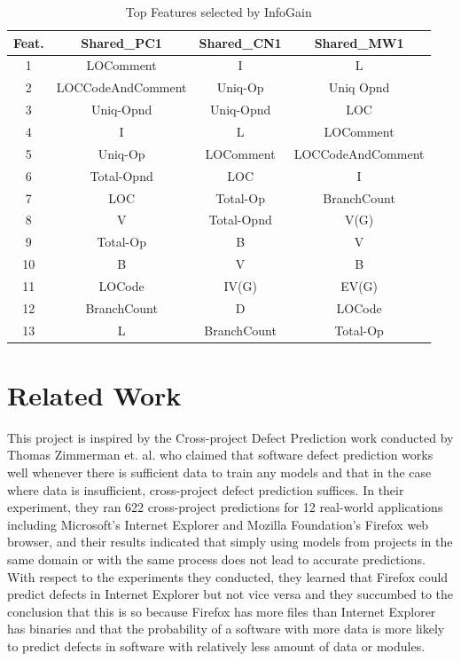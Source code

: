 \documentclass{sig-alternate}
\begin{document}
\begin{table}
\centering
\caption{Top Features selected by InfoGain}
\begin{tabular}{|c|c|c|c|} \hline
Feat.&Shared_PC1&Shared_CN1&Shared_MW1\\\hline
1& LOComment & I & L\\ \hline
2& LOCCodeAndComment & Uniq-Op & Uniq Opnd\\ \hline
3& Uniq-Opnd & Uniq-Opnd & LOC\\ \hline
4&  I & L & LOComment\\ \hline
5& Uniq-Op & LOComment & LOCCodeAndComment\\ \hline
6& Total-Opnd & LOC & I\\ \hline
7& LOC & Total-Op & BranchCount\\ \hline
8& V & Total-Opnd & V(G)\\ \hline
9& Total-Op & B & V\\ \hline
10& B & V & B\\ \hline
11& LOCode & IV(G) & EV(G)\\ \hline
12& BranchCount & D & LOCode\\ \hline
13& L & BranchCount & Total-Op\\ \hline

\hline\end{tabular}
\end{table}


\section{Related Work}
This project is inspired by the Cross-project Defect Prediction work conducted by Thomas Zimmerman et. al. who claimed that software defect prediction works well whenever there is sufficient data to train any models and that in the case where data is insufficient, cross-project defect prediction suffices\cite{zimmerman09}. In their experiment, they ran 622 cross-project predictions for 12 real-world applications including Microsoft's Internet Explorer and Mozilla Foundation's Firefox web browser, and their results indicated that simply using models from projects in the same domain or with the same process does not lead to accurate predictions. With respect to the experiments they conducted, they learned that Firefox could predict defects in Internet Explorer but not vice versa and they succumbed to the conclusion that this is so because Firefox has more files than Internet Explorer has binaries and that the probability of a software with more data is more likely to predict defects in software with relatively less amount of data or modules. 
\end{document}
